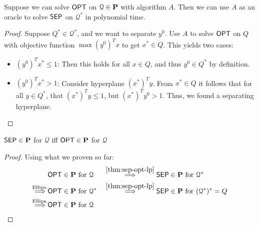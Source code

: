 \begin{theorem}
    Suppose we can solve $\mathsf{OPT}$ on $\mathcal{Q} \in \pP$ with algorithm $A$.
    Then we can use $A$ as an oracle to solve $\mathsf{SEP}$ on $\mathcal{Q}^*$ in polynomial time.
    \label{thm:sep-opt-lp}
\end{theorem}
\begin{proof}
    Suppose $Q^* \in \mathcal{Q}^*$, and we want to separate $y^0$.
    Use $A$ to solve $\mathsf{OPT}$ on $Q$ with objective function $\max (y^0)^Tx$ to get $x^* \in Q$.
    This yields two cases:
    \begin{itemize}
        \item $(y^0)^Tx^* \leq 1$: Then this holds for all $x \in Q$, and thus $y^0 \in Q^*$ by definition.
        \item $(y^0)^Tx^* > 1$: Consider hyperplane $(x^*)^Ty$. From $x^* \in Q$ it follows that
              for all $y \in Q^*$, that $(x^*)^Ty \leq 1$, but $(x^*)^Ty^0 > 1$. Thus, we found a separating hyperplane.
    \end{itemize}
\end{proof}
\begin{theorem}
    $\mathsf{SEP} \in \mathbf{P}$ for $\mathcal{Q}$ iff $\mathsf{OPT} \in \mathbf{P}$ for $\mathcal{Q}$
\end{theorem}
\begin{proof} Using what we proven so far:
    \begin{align*}
                                       & \OPT \in \pP \text{ for } \mathcal{Q}   &  & \overset{\ref{thm:sep-opt-lp}}{\IMP}  \SEP \in \pP \text{ for } \mathcal{Q}^*       \\
        \overset{\text{Ellips.}}{\IMP} & \OPT \in \pP \text{ for } \mathcal{Q}^* &  & \overset{\ref{thm:sep-opt-lp}}{\IMP}  \SEP \in \pP \text{ for } (\mathcal{Q}^*)^*=Q \\
        \overset{\text{Ellips.}}{\IMP} & \OPT \in \pP \text{ for } \mathcal{Q}
    \end{align*}
\end{proof}